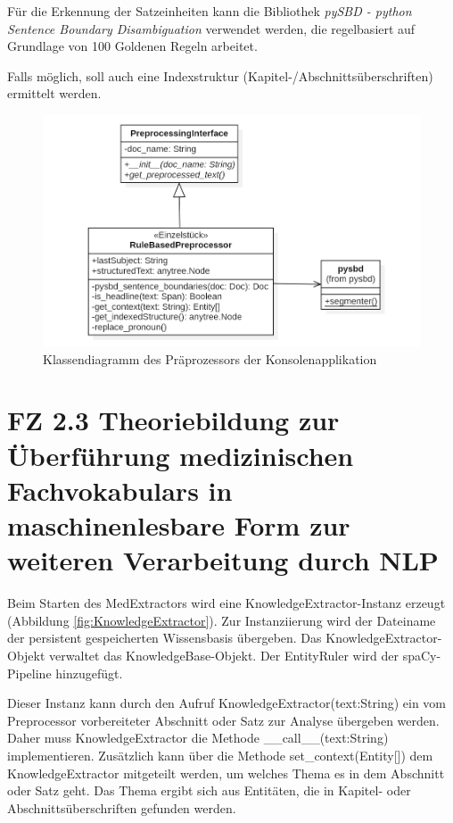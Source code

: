 Für die Erkennung der Satzeinheiten kann die Bibliothek \emph{pySBD - python Sentence Boundary Disambiguation} verwendet werden, die regelbasiert auf Grundlage von 100 \glqq Goldenen Regeln\grqq{} arbeitet.

Falls möglich, soll auch eine Indexstruktur (Kapitel-/Abschnittsüberschrif\-ten) ermittelt werden.

\begin{figure}[h]
    \centering
    \includegraphics[width=\textwidth]{pictures/RuleBasedPreprocessor.png}
    \caption{Klassendiagramm des Präprozessors der Konsolenapplikation}
    \label{fig:preprocessor}
\end{figure}

\section{FZ 2.3 Theoriebildung zur Überführung medizinischen Fachvokabulars in maschinenlesbare Form zur weiteren Verarbeitung durch NLP}
\label{sec:FZ2.3} 

Beim Starten des MedExtractors wird eine KnowledgeExtractor-Instanz erzeugt (Abbildung \ref{fig:KnowledgeExtractor}). Zur Instanziierung wird der Dateiname der persistent gespeicherten Wissensbasis übergeben. Das KnowledgeExtractor-Objekt verwaltet das KnowledgeBase-Objekt. Der EntityRuler wird der spaCy-Pipeline hinzugefügt.

Dieser Instanz kann durch den Aufruf KnowledgeExtractor(text:String) ein vom Preprocessor vorbereiteter Abschnitt oder Satz zur Analyse übergeben werden. Daher muss KnowledgeExtractor die Methode \_\_call\_\_(text:String) implementieren. Zusätzlich kann über die Methode set\_context(Entity[]) dem KnowledgeExtractor mitgeteilt werden, um welches Thema es in dem Abschnitt oder Satz geht. Das Thema ergibt sich aus Entitäten, die in Kapitel- oder Abschnittsüberschriften gefunden werden.

